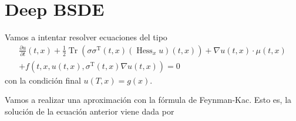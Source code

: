 \documentclass{article}
\begin{document}
	\section*{Deep BSDE}
	Vamos a intentar resolver ecuaciones del tipo 
	\begin{equation}
		\begin{gathered}
			\frac{\partial u}{\partial t}(t, x)+\frac{1}{2} \operatorname{Tr}\left(\sigma \sigma^{\mathrm{T}}(t, x)\left(\operatorname{Hess}_x u\right)(t, x)\right)+\nabla u(t, x) \cdot \mu(t, x) \\
			+f\left(t, x, u(t, x), \sigma^{\mathrm{T}}(t, x) \nabla u(t, x)\right)=0
		\end{gathered}
	\end{equation}
con la condición final $u(T,x)=g(x)$.

Vamos a realizar una aproximación con la fórmula de Feynman-Kac. Esto es, la solución de la ecuación anterior viene dada por 
\end{document}

